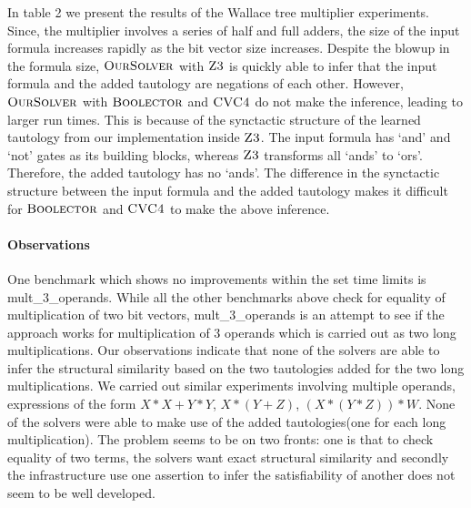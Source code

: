 

In table 2 we present the results of the Wallace tree multiplier experiments. Since, the multiplier involves a series of half and full adders, the size of the input formula increases rapidly as the bit vector size increases. Despite the blowup in the formula size, $\textsc{OurSolver}$ with $\textsc{Z3}$ is quickly able to infer that the input formula and the added tautology are negations of each other. However, $\textsc{OurSolver}$ with $\textsc{Boolector}$ and $\textsc{CVC4}$ do not make the inference, leading to larger run times. This is because of the synctactic structure of the learned tautology from our implementation inside $\textsc{Z3}$. The input formula has `and' and `not' gates as its building blocks, whereas $\textsc{Z3}$ transforms all `ands' to `ors'. Therefore, the added tautology has no `ands'. The difference in the synctactic structure between the input formula and the added tautology makes it difficult for $\textsc{Boolector}$ and $\textsc{CVC4}$ to make the above inference. 

\paragraph{\bf Observations}
%
One benchmark which shows no improvements within the set time limits is mult\_3\_operands. While all the other benchmarks above check for equality of multiplication of two bit vectors, mult\_3\_operands is an attempt to see if the approach works for multiplication of 3 operands which is carried out as two long multiplications. Our observations indicate that none of the solvers are able to infer the structural similarity based on the two tautologies added for the two long multiplications. We carried out similar experiments involving multiple operands, expressions of the form $X*X + Y*Y$, $X*(Y+Z)$, $(X*(Y*Z))*W$. None of the solvers were able to make use of the added tautologies(one for each long multiplication). The problem seems to be on two fronts: one is that to check equality of two terms, the solvers want exact structural similarity and secondly the infrastructure use one assertion to infer the satisfiability of another does not seem to be well developed. 







